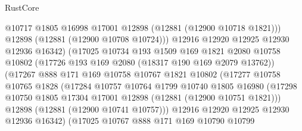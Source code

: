 \begin{lexlean}{RustCore}
\begin{coremodule}
                                @10717
                                @1805
                                @16998
                                @17001
                                @12898
                                (@12881 (@12900 @10718 @1821)))
                              @12898
                              (@12881 (@12900 @10708 @10724)))
                            @12916
                            @12920
                            @12925
                            @12930
                            @12936
                            @16342)
                          (@17025
                            @10734
                            @193
                            @1509
                            @169
                            @1821
                            @2080
                            @10758
                            @10802
                            (@17726 @193 @169 @2080 (@18317 @190 @169 @2079 @13762))
                            (@17267
                              @888
                              @171
                              @169
                              @10758
                              @10767
                              @1821
                              @10802
                              (@17277
                                @10758
                                @10765
                                @1828
                                (@17284
                                  @10757
                                  @10764
                                  @1799
                                  @10740
                                  @1805
                                  @16980
                                  (@17298
                                    @10750
                                    @1805
                                    @17304
                                    @17001
                                    @12898
                                    (@12881 (@12900 @10751 @1821)))
                                  @12898
                                  (@12881 (@12900 @10741 @10757)))
                                @12916
                                @12920
                                @12925
                                @12930
                                @12936
                                @16342)
                              (@17025
                                @10767
                                @888
                                @171
                                @169
                                @10790
                                @10799

\end{coremodule}
\end{lexlean}

